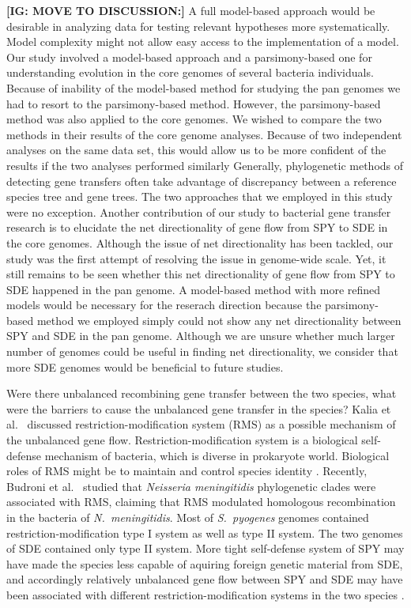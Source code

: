 \documentclass[10pt]{article}
\let\citep\cite
\let\citet\cite
\begin{document}
{\bf [IG: MOVE TO DISCUSSION:]}
A full model-based approach would be desirable in analyzing data for testing
relevant hypotheses more systematically. Model complexity might not allow easy
access to the implementation of a model. Our study involved a model-based
approach and a parsimony-based one for understanding evolution in the core
genomes of several bacteria individuals. Because of inability of the model-based
method for studying the pan genomes we had to resort to the parsimony-based
method. However, the parsimony-based method was also applied to the core
genomes. We wished to compare the two methods in their results of the core
genome analyses.  Because of two independent analyses on the same data set, this
would allow us to be more confident of the results if the two analyses performed
similarly Generally, phylogenetic methods of detecting gene transfers often take
advantage of discrepancy between a reference species tree and gene trees. The
two approaches that we employed in this study were no exception. 
Another contribution of our study to bacterial gene transfer research is to
elucidate the net directionality of gene flow from SPY to SDE in the core
genomes. Although the issue of net directionality has been tackled, our study
was the first attempt of resolving the issue in genome-wide scale. Yet, it still
remains to be seen whether this net directionality of gene flow from SPY to SDE
happened in the pan genome. A model-based method with more refined models would
be necessary for the reserach direction because the parsimony-based method we
employed simply could not show any net directionality between SPY and SDE in the
pan genome. Although we are unsure whether much larger number of genomes could
be useful in finding net directionality, we consider that more SDE genomes would
be beneficial to future studies. 
%

Were there unbalanced recombining gene transfer between the two species, what
were the barriers \citep{Thomas2005} to cause the unbalanced gene transfer in
the species?  Kalia et al.\ \citet{Kalia2001} discussed restriction-modification system (RMS)
as a possible mechanism of the unbalanced gene flow.  Restriction-modification
system is a biological self-defense mechanism of bacteria, which is diverse in
prokaryote world.  Biological roles of RMS might be to maintain and control
species identity \citep{Jeltsch2003}.  Recently, Budroni et al.\ \citet{Budroni2011a} studied
that \textit{Neisseria meningitidis} phylogenetic clades were associated with
RMS, claiming that RMS modulated homologous recombination in the bacteria of
\textit{N.\ meningitidis}.  Most of \textit{S.\ pyogenes} genomes contained
restriction-modification type I system as well as type II system. The two
genomes of SDE contained only type II system. More tight self-defense system of
SPY may have made the species less capable of aquiring foreign genetic material
from SDE, and accordingly relatively unbalanced gene flow between SPY and SDE
may have been associated with different restriction-modification systems in the
two species \citep{Kalia2001}.
\end{document}
